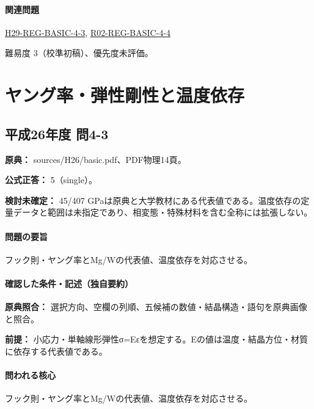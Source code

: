 \paragraph{関連問題} \hyperref[q:h29-reg-basic-4-3]{H29-REG-BASIC-4-3}, \hyperref[q:r02-reg-basic-4-4]{R02-REG-BASIC-4-4}

\par 難易度 3（校準初稿）、優先度未評価。

\section{ヤング率・弾性剛性と温度依存}

\subsection{平成26年度 問4-3}
\label{q:h26-reg-basic-4-3}

\noindent\textbf{原典：} sources/H26/basic.pdf、PDF物理14頁。

\textbf{公式正答：} 5（single）。

\par\textbf{検討未確定：} 45/407 GPaは原典と大学教材にある代表値である。温度依存の定量データと範囲は未指定であり、相変態・特殊材料を含む全称には拡張しない。

\paragraph{問題の要旨} フック則・ヤング率とMg/Wの代表値、温度依存を対応させる。

\paragraph{確認した条件・記述（独自要約）}\mbox{}\par

\noindent\textbf{原典照合：} 選択方向、空欄の列順、五候補の数値・結晶構造・語句を原典画像と照合。\par

\noindent\textbf{前提：} 小応力・単軸線形弾性σ=Eεを想定する。Eの値は温度・結晶方位・材質に依存する代表値である。\par

\paragraph{問われる核心} フック則・ヤング率とMg/Wの代表値、温度依存を対応させる。

